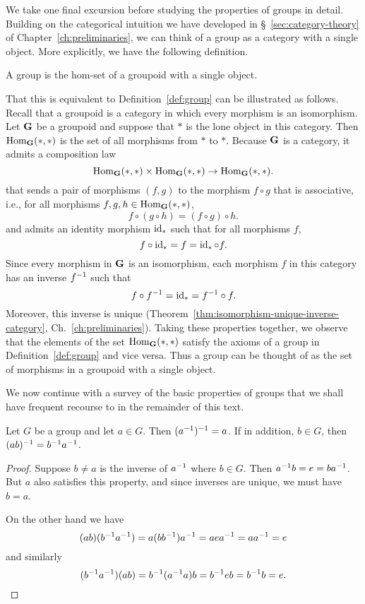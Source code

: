 We take one final excursion before studying the properties of groups in detail.
Building on the categorical intuition we have developed in
\S~\ref{sec:category-theory} of Chapter~\ref{ch:preliminaries}, we can think of
a group as a category with a single object. More explicitly, we have the
following definition.

\begin{definition}
    \label{def:group-as-category}
    A group is the hom-set of a groupoid with a single object.
\end{definition}

That this is equivalent to Definition~\ref{def:group} can be illustrated as
follows. Recall that a groupoid is a category in which every morphism is an
isomorphism. Let \(\mathbf{G}\) be a groupoid and suppose that \(*\) is the lone
object in this category. Then \(\operatorname{Hom}_{\mathbf{G}}(*, *)\) is the set of all
morphisms from \(*\) to \(*\). Because \(\mathbf{G}\) is a category, it admits a
composition law
\[
    \operatorname{Hom}_{\mathbf{G}}(*, *) \times \operatorname{Hom}_{\mathbf{G}}(*, *) \to \operatorname{Hom}_{\mathbf{G}}(*, *).
\]
that sends a pair of morphisms \((f, g)\) to the morphism \(f \circ g\) that is
associative, i.e., for all morphisms \(f, g, h \in \operatorname{Hom}_{\mathbf{G}}(*, *)\),
\[
    f \circ (g \circ h) = (f \circ g) \circ h.
\]
and admits an identity morphism \(\operatorname{id}_{*}\) such that for all morphisms \(f\),
\[
    f \circ \operatorname{id}_{*} = f = \operatorname{id}_{*} \circ f.
\]
Since every morphism in \(\mathbf{G}\) is an isomorphism, each morphism \(f\) in
this category has an inverse \(f^{-1}\) such that
\[
    f \circ f^{-1} = \operatorname{id}_{*} = f^{-1} \circ f.
\]
Moreover, this inverse is unique
(Theorem~\ref{thm:isomorphism-unique-inverse-category},
Ch.~\ref{ch:preliminaries}). Taking these properties together, we observe that
the elements of the set \(\operatorname{Hom}_{\mathbf{G}}(*, *)\) satisfy the axioms of a group
in Definition~\ref{def:group} and vice versa. Thus a group can be thought of as
the set of morphisms in a groupoid with a single object.

We now continue with a survey of the basic properties of groups that we shall
have frequent recourse to in the remainder of this text.

\begin{theorem}
    \label{thm:group-inverses}
    Let \(G\) be a group and let \(a \in G\). Then \((a^{-1})^{-1} = a\). If in
    addition, \(b \in G\), then \((ab)^{-1} = b^{-1} a^{-1}\).
\end{theorem}

\begin{proof}
    Suppose \(b \neq a\) is the inverse of \(a^{-1}\) where \(b \in G\). Then
    \(a^{-1} b = e = ba^{-1}\). But \(a\) also satisfies this property, and since
    inverses are unique, we must have \(b = a\).

    On the other hand we have
    \[
        (ab)(b^{-1} a^{-1}) = a(bb^{-1})a^{-1} = aea^{-1} = aa^{-1} = e
    \]
    and similarly
    \[
        (b^{-1} a^{-1})(ab) = b^{-1} (a^{-1} a)b = b^{-1} eb = b^{-1} b = e.
    \]
\end{proof}


